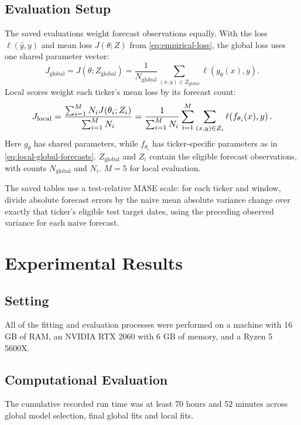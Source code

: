 \documentclass[12pt,a4paper]{article}
\numberwithin{equation}{section}
\numberwithin{table}{section}
\numberwithin{figure}{section}
\begin{document}
\subsection{Evaluation Setup}

The saved evaluations weight forecast observations equally. With the loss $\ell(\widehat y,y)$ and mean loss $J(\theta;Z)$ from \eqref{eq:empirical-loss}, the global loss uses one shared parameter vector:
\begin{equation}\label{eq:evaluation-global-loss}
J_{\mathrm{global}}=J(\theta;Z_{\mathrm{global}})
=\frac{1}{N_{\mathrm{global}}}\sum_{(x,y)\in Z_{\mathrm{global}}}
\ell\!\left(g_{\theta}(x),y\right).
\end{equation}
Local scores weight each ticker's mean loss by its forecast count:
\begin{equation}\label{eq:evaluation-local-loss}
\resizebox{0.85\linewidth}{!}{$\displaystyle J_{\mathrm{local}}=\frac{\sum_{i=1}^{M}N_iJ(\theta_i;Z_i)}{\sum_{i=1}^{M}N_i}
=\frac{1}{\sum_{i=1}^{M}N_i}\sum_{i=1}^{M}\sum_{(x,y)\in Z_i}\ell\!\left(f_{\theta_i}(x),y\right).$}
\end{equation}
Here $g_{\theta}$ has shared parameters, while $f_{\theta_i}$ has ticker-specific parameters as in \eqref{eq:local-global-forecasts}. $Z_{\mathrm{global}}$ and $Z_i$ contain the eligible forecast observations, with counts $N_{\mathrm{global}}$ and $N_i$. $M=5$ for local evaluation. 

The saved tables use a test-relative MASE scale: for each ticker and window, divide absolute forecast errors by the naive mean absolute variance change over exactly that ticker's eligible test target dates, using the preceding observed variance for each naive forecast. 

\section{Experimental Results}

\subsection{Setting}
All of the fitting and evaluation processes were performed on a machine with 16 GB of RAM, an NVIDIA RTX 2060 with 6 GB of memory, and a Ryzen 5 5600X.

\subsection{Computational Evaluation}
The cumulative recorded run time was at least 70 hours and 52 minutes across global model selection, final global fits and local fits.
\end{document}
